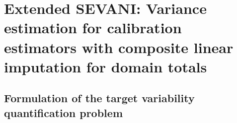 

\section{Extended SEVANI: Variance estimation for {\color{red}calibration} estimators with composite linear imputation for {\color{red}domain totals}}
\label{CalibrationDomainTotalSEVANI}


\subsection{Formulation of the target variability quantification problem}
\label{CalibrationDomainTotalFormulationOfVarianceEstimationProblem}
\setcounter{theorem}{0}


